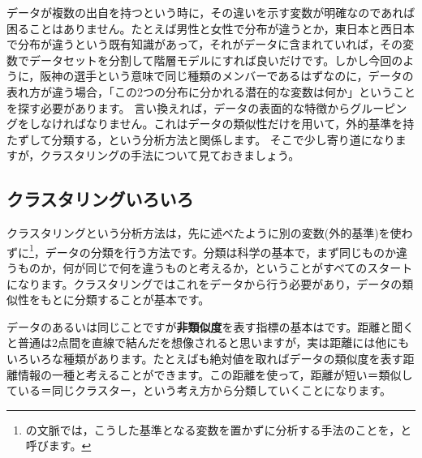 \documentclass{ltjsbook}
\begin{document}
データが複数の出自を持つという時に，その違いを示す変数が明確なのであれば困ることはありません。たとえば男性と女性で分布が違うとか，東日本と西日本で分布が違うという既有知識があって，それがデータに含まれていれば，その変数でデータセットを分割して階層モデルにすれば良いだけです。しかし今回のように，阪神の選手という意味で同じ種類のメンバーであるはずなのに，データの表れ方が違う場合，「この2つの分布に分かれる潜在的な変数は何か」ということを探す必要があります。
言い換えれば，データの表面的な特徴からグルーピングをしなければなりません。これはデータの類似性だけを用いて，外的基準を持たずして分類する，という分析方法と関係します。
そこで少し寄り道になりますが，クラスタリングの手法について見ておきましょう。

\subsection{クラスタリングいろいろ}
クラスタリングという分析方法は，先に述べたように別の変数(外的基準)を使わずに\footnote{の文脈では，こうした基準となる変数を置かずに分析する手法のことを，と呼びます。}，データの分類を行う方法です。分類は科学の基本で，まず同じものか違うものか，何が同じで何を違うものと考えるか，ということがすべてのスタートになります。クラスタリングではこれをデータから行う必要があり，データの類似性をもとに分類することが基本です。

データのあるいは同じことですが\textbf{非類似度}を表す指標の基本はです。距離と聞くと普通は2点間を直線で結んだを想像されると思いますが，実は距離には他にもいろいろな種類があります。たとえばも絶対値を取ればデータの類似度を表す距離情報の一種と考えることができます。この距離を使って，距離が短い＝類似している＝同じクラスター，という考え方から分類していくことになります。
\end{document}
